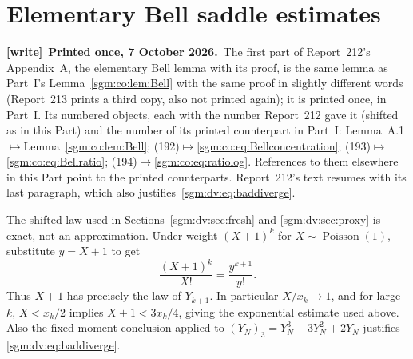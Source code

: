 \documentclass[11pt,letterpaper]{article}
\theoremstyle{remark}\newtheorem{remark}[theorem]{Remark}
\newcommand{\Poi}{\operatorname{Poisson}}\newcommand{\Bin}{\operatorname{Bin}}
\newenvironment{writenote}[1][]{\par\smallskip\begingroup\small
 \noindent\textbf{[write]}\if\relax\detokenize{#1}\relax\else~\textbf{#1.}\fi\ }%
 {\par\endgroup\smallskip}
\theoremstyle{definition}\newtheorem{definition}[theorem]{Definition}
\begin{document}
\appendix{}
\section{Elementary Bell saddle estimates}\label{sgm:dv:sec:bell}
\begin{writenote}[Printed once, 7 October 2026]The first part of Report~212's Appendix~A, the elementary Bell lemma with its proof, is the same lemma as Part~I's Lemma~\ref{sgm:co:lem:Bell} with the same proof in slightly different words (Report~213 prints a third copy, also not printed again); it is printed once, in Part~I. Its numbered objects, each with the number Report~212 gave it (shifted as in this Part) and the number of its printed counterpart in Part~I: Lemma~A.1${}\mapsto{}$Lemma~\ref{sgm:co:lem:Bell}; (192)${}\mapsto{}$\eqref{sgm:co:eq:Bellconcentration}; (193)${}\mapsto{}$\eqref{sgm:co:eq:Bellratio}; (194)${}\mapsto{}$\eqref{sgm:co:eq:ratiolog}. References to them elsewhere in this Part point to the printed counterparts. Report~212's text resumes with its last paragraph, which also justifies~\eqref{sgm:dv:eq:baddiverge}.
\end{writenote}
\addtocounter{equation}{3}%
The shifted law used in Sections~\ref{sgm:dv:sec:fresh} and \ref{sgm:dv:sec:proxy} is exact, not an approximation. Under weight $(X+1)^k$ for $X\sim\Poi(1)$, substitute $y=X+1$ to get
\[
 \frac{(X+1)^k}{X!}=\frac{y^{k+1}}{y!}.
\]
Thus $X+1$ has precisely the law of $Y_{k+1}$. In particular $X/x_k\to1$, and for large $k$, $X<x_k/2$ implies $X+1<3x_k/4$, giving the exponential estimate used above. Also the fixed-moment conclusion applied to $(Y_N)_3=Y_N^3-3Y_N^2+2Y_N$ justifies \eqref{sgm:dv:eq:baddiverge}.
\end{document}
